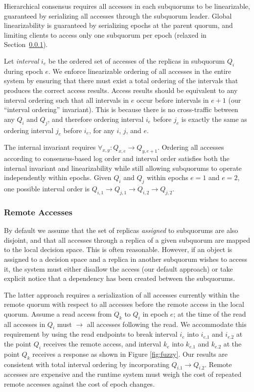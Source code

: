 \documentclass[11pt,letterpaper]{article}
\begin{document}
Hierarchical consensus requires all accesses in each subquorums to be linearizable,
guaranteed by serializing all accesses through the subquorum leader.
Global linearizability is guaranteed by serializing epochs at the parent
quorum, and limiting clients to access only one subquorum per epoch (relaxed
in Section~\ref{sec:remote}).

Let \emph{interval} $i_e$ be the ordered set of accesses of the replicas in subquorum
$Q_i$ during epoch $e$.
We enforce linearizable ordering of all accesses in the entire system by
ensuring that there must exist a total ordering of the intervals that produces the correct
access results.
Access results should be equivalent to any interval ordering
such that all intervals in $e$ occur before intervals in $e+1$ (our ``interval
ordering'' invariant).
This is because there is no cross-traffic between any $Q_i$ and $Q_j$, and therefore
ordering interval $i_e$ before $j_e$ is exactly the same as ordering interval $j_e$
before $i_e$, for any $i$, $j$, and $e$.

The internal invariant requires $\forall_{x,y} : Q_{x,e} \rightarrow Q_{y,e+1}$.
Ordering all accesses according to consensus-based log order and interval order satisfies both the
internal invariant and linearizability  while still allowing subquorums to operate
independently within epochs.
Given $Q_i$ and $Q_j$ within epochs $e=1$ and $e=2$, one possible interval order is
$Q_{i,1} \rightarrow Q_{j,1} \rightarrow Q_{i,2} \rightarrow Q_{j,2}$.

\subsubsection{Remote Accesses}
\label{sec:remote}
\vspace{-.5em}

By default we assume that the set of replicas \emph{assigned} to subquorums are also
disjoint, and that all accesses through a replica of a given subquorum are mapped to the
local decision space.
This is often reasonable.
However, if an object is assigned to a decision space and a replica in another subquorum
wishes to
access it, the system must either disallow the access (our default approach) or take
explicit notice that a dependency has been created between the subquorums.

The latter approach requires a serialization of all accesses currently within the remote
quorum with respect to all accesses before the remote access in the local quorum.
Assume a read access from $Q_k$ to $Q_i$ in epoch $e$; at the time of the read all
accesses in $Q_i$ must $\rightarrow$ all accesses following the read.
We accommodate this requirement by using the read endpoints to break interval $i_e$ into
$i_{e.1}$ and $i_{e.2}$ at the point $Q_i$ receives the remote access, and interval $k_e$
into $k_{e.1}$ and $k_{e.2}$ at the point $Q_k$ receives a response as shown in
Figure \ref{fig:fuzzy}.
Our results are consistent with total interval ordering by incorporating $Q_{i.1}
\rightarrow Q_{i.2}$.
Remote accesses are expensive and the runtime system must weigh the cost of repeated
remote accesses against the cost of epoch changes.
\end{document}
